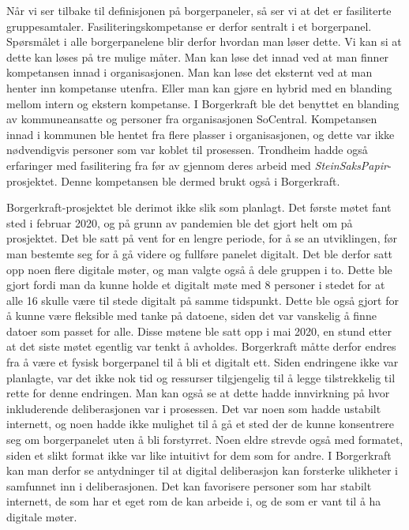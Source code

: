\documentclass[
  12pt,
  a4paper, 12pt]{article}
\begin{document}
Når vi ser tilbake til definisjonen på borgerpaneler, så ser vi at det er fasiliterte gruppesamtaler. Fasiliteringskompetanse er derfor sentralt i et borgerpanel. Spørsmålet i alle borgerpanelene blir derfor hvordan man løser dette. Vi kan si at dette kan løses på tre mulige måter. Man kan løse det innad ved at man finner kompetansen innad i organisasjonen. Man kan løse det eksternt ved at man henter inn kompetanse utenfra. Eller man kan gjøre en hybrid med en blanding mellom intern og ekstern kompetanse. I Borgerkraft ble det benyttet en blanding av kommuneansatte og personer fra organisasjonen SoCentral. Kompetansen innad i kommunen ble hentet fra flere plasser i organisasjonen, og dette var ikke nødvendigvis personer som var koblet til prosessen. Trondheim hadde også erfaringer med fasilitering fra før av gjennom deres arbeid med \emph{SteinSaksPapir}-prosjektet. Denne kompetansen ble dermed brukt også i Borgerkraft.

Borgerkraft-prosjektet ble derimot ikke slik som planlagt. Det første møtet fant sted i februar 2020, og på grunn av pandemien ble det gjort helt om på prosjektet. Det ble satt på vent for en lengre periode, for å se an utviklingen, før man bestemte seg for å gå videre og fullføre panelet digitalt. Det ble derfor satt opp noen flere digitale møter, og man valgte også å dele gruppen i to. Dette ble gjort fordi man da kunne holde et digitalt møte med 8 personer i stedet for at alle 16 skulle være til stede digitalt på samme tidspunkt. Dette ble også gjort for å kunne være fleksible med tanke på datoene, siden det var vanskelig å finne datoer som passet for alle. Disse møtene ble satt opp i mai 2020, en stund etter at det siste møtet egentlig var tenkt å avholdes. Borgerkraft måtte derfor endres fra å være et fysisk borgerpanel til å bli et digitalt ett. Siden endringene ikke var planlagte, var det ikke nok tid og ressurser tilgjengelig til å legge tilstrekkelig til rette for denne endringen. Man kan også se at dette hadde innvirkning på hvor inkluderende deliberasjonen var i prosessen. Det var noen som hadde ustabilt internett, og noen hadde ikke mulighet til å gå et sted der de kunne konsentrere seg om borgerpanelet uten å bli forstyrret. Noen eldre strevde også med formatet, siden et slikt format ikke var like intuitivt for dem som for andre. I Borgerkraft kan man derfor se antydninger til at digital deliberasjon kan forsterke ulikheter i samfunnet inn i deliberasjonen. Det kan favorisere personer som har stabilt internett, de som har et eget rom de kan arbeide i, og de som er vant til å ha digitale møter.
\end{document}
